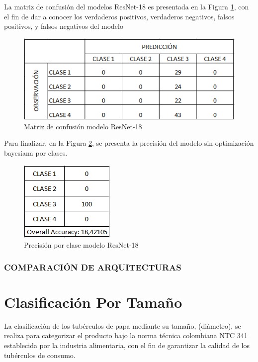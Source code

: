 	La matriz de confusión del modelos ResNet-18 es presentada en la Figura \ref*{MC_RESNET18}, con el fin de dar a conocer los verdaderos positivos, verdaderos negativos, falsos positivos, y falsos negativos del modelo
	
	\begin{figure}[ht]
		\centering
		\includegraphics[scale=0.55]{Figs/71.png}
		\caption{Matriz de confusión modelo ResNet-18}
		\label{MC_RESNET18}
	\end{figure}
		 	
	Para finalizar, en la Figura \ref{clase_RESNET18}, se presenta la precisión del modelo sin optimización bayesiana por clases.
	
	\begin{figure}[ht]
		\centering
		\includegraphics[scale=0.60]{Figs/72.png}
		\caption{Precisión por clase modelo ResNet-18}
		\label{clase_RESNET18}
	\end{figure}
	
			\subsubsection{\MakeUppercase{Comparación de arquitecturas}}
	\newpage		
	\section{Clasificación Por Tamaño}
	
		La clasificación de los tubérculos de papa mediante su tamaño, (diámetro), se realiza para categorizar el producto bajo la norma técnica colombiana NTC 341 establecida por la industria alimentaria, con el fin de garantizar la calidad de los tubérculos de consumo.\\
		
